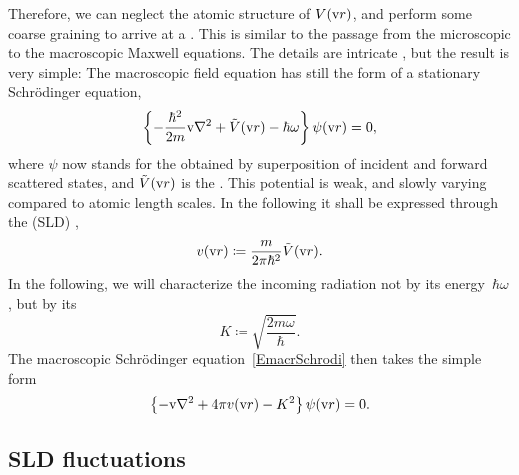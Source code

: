 Therefore,
we can neglect the atomic structure of $V(\text{v}{r})$,
and perform some coarse graining to
arrive at a .
%
This is
similar to the passage from
the microscopic to the macroscopic Maxwell equations.
The details are intricate \cite{Sea89,Lax51},
but the result \cite[eq.~2.8.32]{Sea89} is very simple:
The macroscopic field equation
has still the form of a stationary Schrödinger equation,
%
\begin{equation}\label{EmacrSchrodi}
  \left\{-\frac{\hbar^2}{2m}\text{v}{\nabla}^2+\tilde{V}(\text{v}{r})-\hbar\omega\right\} \psi(\text{v}{r}) = 0,
\end{equation}
%
%
where $\psi$ now stands for the 
%
%
obtained by superposition of
incident and forward scattered states,
and $\tilde{V}(\text{v}{r})$ is the .
%
This potential is weak, and slowly varying compared to atomic length scales.
In the following it shall be expressed through the
 (SLD)
%
%
%
\cite[eq.\ 2.8.37]{Sea89},
%
\begin{equation}
  v(\text{v}{r})\coloneqq\frac{m}{2\pi \hbar^2}\tilde{V}(\text{v}{r}).
\end{equation}
In the following, we will characterize the incoming radiation
not by its energy~$\hbar\omega$,
but by its 
%
%
%
\begin{equation}
  K \coloneqq \sqrt{\frac{2m\omega}{\hbar}}.
\end{equation}
The macroscopic Schrödinger equation~\cref{EmacrSchrodi} then takes the simple form
\begin{equation}\label{ESchrodi2}
  \left\{-\text{v}{\nabla}^2+4\pi v(\text{v}{r})-K^2\right\} \psi(\text{v}{r}) = 0.
\end{equation}

\subsection{SLD fluctuations}\label{Sfluct}

